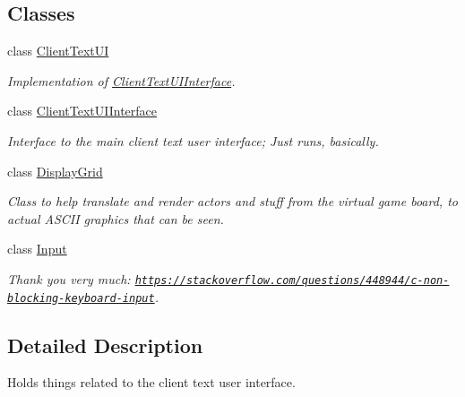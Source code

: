\subsection*{Classes}
\begin{DoxyCompactItemize}
\item 
class \hyperlink{classAsteroids_1_1UI_1_1ClientTextUI_1_1ClientTextUI}{Client\+Text\+UI}
\begin{DoxyCompactList}\small\item\em Implementation of \hyperlink{classAsteroids_1_1UI_1_1ClientTextUI_1_1ClientTextUIInterface}{Client\+Text\+U\+I\+Interface}. \end{DoxyCompactList}\item 
class \hyperlink{classAsteroids_1_1UI_1_1ClientTextUI_1_1ClientTextUIInterface}{Client\+Text\+U\+I\+Interface}
\begin{DoxyCompactList}\small\item\em Interface to the main client text user interface; Just runs, basically. \end{DoxyCompactList}\item 
class \hyperlink{classAsteroids_1_1UI_1_1ClientTextUI_1_1DisplayGrid}{Display\+Grid}
\begin{DoxyCompactList}\small\item\em Class to help translate and render actors and stuff from the virtual game board, to actual A\+S\+C\+II graphics that can be seen. \end{DoxyCompactList}\item 
class \hyperlink{classAsteroids_1_1UI_1_1ClientTextUI_1_1Input}{Input}
\begin{DoxyCompactList}\small\item\em Thank you very much\+: \href{https://stackoverflow.com/questions/448944/c-non-blocking-keyboard-input}{\tt https\+://stackoverflow.\+com/questions/448944/c-\/non-\/blocking-\/keyboard-\/input}. \end{DoxyCompactList}\end{DoxyCompactItemize}


\subsection{Detailed Description}
Holds things related to the client text user interface. 